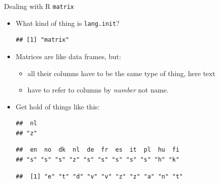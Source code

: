 \begin{frame}[fragile]{Dealing with R \texttt{matrix}}
  
  \begin{itemize}
  \item What kind of thing is \texttt{lang.init}?
    
\begin{knitrout}
\color{fgcolor}\begin{kframe}
\begin{alltt}
\end{alltt}
\begin{verbatim}
## [1] "matrix"
\end{verbatim}
\end{kframe}
\end{knitrout}

\item Matrices are like data frames, but:
  \begin{itemize}
  \item all their columns have to be the same type of thing, here text
  \item have to refer to columns by \emph{number} not name.
  \end{itemize}
  
\item Get hold of things like this:
  
\begin{knitrout}\footnotesize
{}\color{fgcolor}\begin{kframe}
\begin{alltt}
\hlstd{lang.init[}\hlstd{,}\hlstd{]}
\end{alltt}
\begin{verbatim}
##  nl 
## "z"
\end{verbatim}
\begin{alltt}
\hlstd{lang.init[}\hlstd{,]} 
\end{alltt}
\begin{verbatim}
##  en  no  dk  nl  de  fr  es  it  pl  hu  fi 
## "s" "s" "s" "z" "s" "s" "s" "s" "s" "h" "k"
\end{verbatim}
\begin{alltt}
\hlstd{lang.init[,}\hlstd{]} 
\end{alltt}
\begin{verbatim}
##  [1] "e" "t" "d" "v" "v" "z" "z" "a" "n" "t"
\end{verbatim}
\end{kframe}
\end{knitrout}
  
  \end{itemize}
  
\end{frame}

